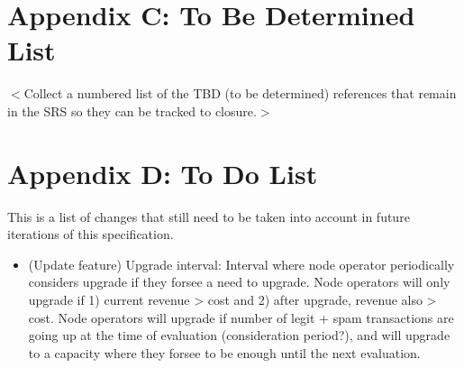 \documentclass{scrreprt}
\begin{document}
\section{Appendix C: To Be Determined List}
$<$Collect a numbered list of the TBD (to be determined) references that remain
in the SRS so they can be tracked to closure.$>$

\section{Appendix D: To Do List}
This is a list of changes that still need to be taken into account in
future iterations of this specification.

\begin{itemize}
   \item (Update feature) Upgrade interval: Interval where node operator periodically considers upgrade if they forsee a need to upgrade. Node operators will only upgrade if 1) current revenue > cost and 2) after upgrade, revenue also > cost. Node operators will upgrade if number of legit + spam transactions are going up at the time of evaluation (consideration period?), and will upgrade to a capacity where they forsee to be enough until the next evaluation.
\end{itemize}
\end{document}
